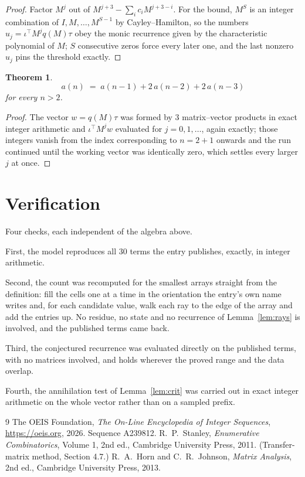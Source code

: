 \documentclass[11pt,a4paper]{article}
\theoremstyle{plain}
\newtheorem{theorem}{Theorem}
\theoremstyle{definition}
\begin{document}
\begin{proof}
Factor $M^{j}$ out of $M^{j+3}-\sum_ic_iM^{j+3-i}$. For the bound, $M^{S}$
is an integer combination of $I,M,\dots,M^{S-1}$ by Cayley--Hamilton, so the numbers
$u_j=\iota^{\!\top}M^{j}q(M)\tau$ obey the monic recurrence given by the characteristic
polynomial of $M$; $S$ consecutive zeros force every later one, and the last nonzero $u_j$
pins the threshold exactly.
\end{proof}

\begin{theorem}
\[
a(n)\;=\;a(n-1) + 2\,a(n-2) + 2\,a(n-3)
\]
for every $n>2$.
\end{theorem}

\begin{proof}
The vector $w=q(M)\tau$ was formed by $3$ matrix--vector products in exact integer
arithmetic and $\iota^{\!\top}M^{j}w$ evaluated for $j=0,1,\dots$, again exactly; those
integers vanish from the index corresponding to $n=2+1$ onwards and the run continued
until the working vector was identically zero, which settles every larger $j$ at once.
\end{proof}

\section{Verification}

Four checks, each independent of the algebra above.

First, the model reproduces all $30$ terms the entry publishes, exactly, in integer
arithmetic.

Second, the count was recomputed for the smallest arrays straight from the definition: fill the
cells one at a time in the orientation the entry's own name writes and, for each candidate
value, walk each ray to the edge of the array and add the entries up. No residue, no state and
no recurrence of Lemma~\ref{lem:rays} is involved, and the published terms came back.

Third, the conjectured recurrence was evaluated directly on the published terms, with no
matrices involved, and holds wherever the proved range and the data overlap.

Fourth, the annihilation test of Lemma~\ref{lem:crit} was carried out in exact integer
arithmetic on the whole vector rather than on a sampled prefix.

\begin{thebibliography}{9}
 The OEIS Foundation, \emph{The On-Line Encyclopedia of Integer
Sequences}, \url{https://oeis.org}, 2026. Sequence A239812.
 R.~P.~Stanley, \emph{Enumerative Combinatorics}, Volume 1, 2nd ed.,
Cambridge University Press, 2011. (Transfer-matrix method, Section 4.7.)
 R.~A.~Horn and C.~R.~Johnson, \emph{Matrix Analysis}, 2nd ed., Cambridge
University Press, 2013.
\end{thebibliography}
\end{document}
